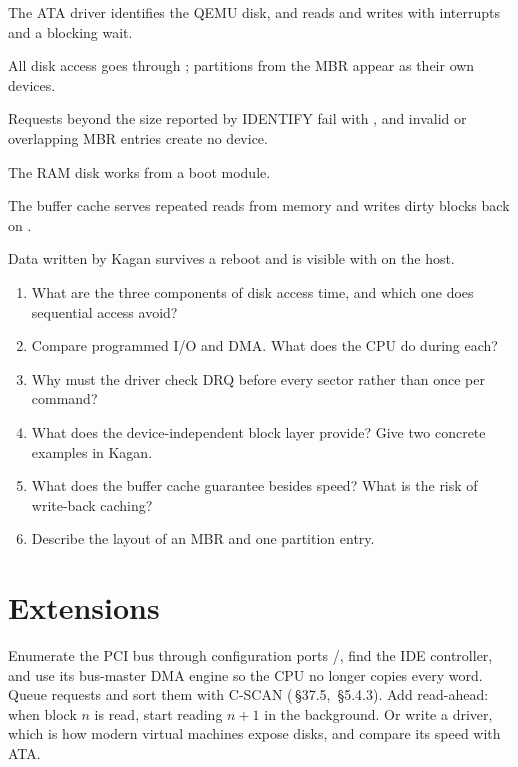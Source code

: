 \documentclass[11pt,a4paper]{article}
\begin{document}
\begin{milestonebox}
\begin{checklist}
  \item The ATA driver identifies the QEMU disk, and reads and writes with interrupts and a blocking wait.
  \item All disk access goes through ; partitions from the MBR appear as their own devices.
  \item Requests beyond the size reported by IDENTIFY fail with , and invalid or overlapping MBR entries create no device.
  \item The RAM disk works from a boot module.
  \item The buffer cache serves repeated reads from memory and writes dirty blocks back on .
  \item Data written by Kagan survives a reboot and is visible with  on the host.
\end{checklist}
\end{milestonebox}

\begin{questionbox}
\begin{enumerate}
  \item What are the three components of disk access time, and which one does sequential access avoid?
  \item Compare programmed I/O and DMA. What does the CPU do during each?
  \item Why must the driver check DRQ before every sector rather than once per command?
  \item What does the device-independent block layer provide? Give two concrete examples in Kagan.
  \item What does the buffer cache guarantee besides speed? What is the risk of write-back caching?
  \item Describe the layout of an MBR and one partition entry.
\end{enumerate}
\end{questionbox}

\section{Extensions}

Enumerate the PCI bus through configuration ports /, find the IDE controller, and use its
bus-master DMA engine so the CPU no longer copies every word. Queue requests and sort them with C-SCAN
(\OSTEP\,\S37.5, \MOS\,\S5.4.3). Add read-ahead: when block $n$ is read, start reading $n+1$ in the background. Or write
a  driver, which is how modern virtual machines expose disks, and compare its speed with ATA.

\booklegend
\end{document}
